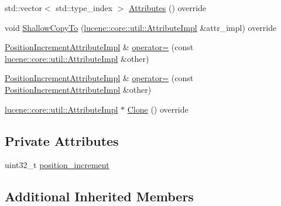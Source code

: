 \begin{DoxyCompactItemize}
\item 
std\+::vector$<$ std\+::type\+\_\+index $>$ \mbox{\hyperlink{classlucene_1_1core_1_1analysis_1_1tokenattributes_1_1PositionIncrementAttributeImpl_ab6028133ca375bdcb9774650828e7388}{Attributes}} () override
\item 
void \mbox{\hyperlink{classlucene_1_1core_1_1analysis_1_1tokenattributes_1_1PositionIncrementAttributeImpl_a887e391d3db93f6a8e76b6b464d60547}{Shallow\+Copy\+To}} (\mbox{\hyperlink{classlucene_1_1core_1_1util_1_1AttributeImpl}{lucene\+::core\+::util\+::\+Attribute\+Impl}} \&attr\+\_\+impl) override
\item 
\mbox{\hyperlink{classlucene_1_1core_1_1analysis_1_1tokenattributes_1_1PositionIncrementAttributeImpl}{Position\+Increment\+Attribute\+Impl}} \& \mbox{\hyperlink{classlucene_1_1core_1_1analysis_1_1tokenattributes_1_1PositionIncrementAttributeImpl_a8fccb463e29cc9cb90e7689cc7161488}{operator=}} (const \mbox{\hyperlink{classlucene_1_1core_1_1util_1_1AttributeImpl}{lucene\+::core\+::util\+::\+Attribute\+Impl}} \&other)
\item 
\mbox{\hyperlink{classlucene_1_1core_1_1analysis_1_1tokenattributes_1_1PositionIncrementAttributeImpl}{Position\+Increment\+Attribute\+Impl}} \& \mbox{\hyperlink{classlucene_1_1core_1_1analysis_1_1tokenattributes_1_1PositionIncrementAttributeImpl_a89b28d766574af0ba1e521adf811fe71}{operator=}} (const \mbox{\hyperlink{classlucene_1_1core_1_1analysis_1_1tokenattributes_1_1PositionIncrementAttributeImpl}{Position\+Increment\+Attribute\+Impl}} \&other)
\item 
\mbox{\hyperlink{classlucene_1_1core_1_1util_1_1AttributeImpl}{lucene\+::core\+::util\+::\+Attribute\+Impl}} $\ast$ \mbox{\hyperlink{classlucene_1_1core_1_1analysis_1_1tokenattributes_1_1PositionIncrementAttributeImpl_a68907cad12693754f1286678a7c78c21}{Clone}} () override
\end{DoxyCompactItemize}
\subsection*{Private Attributes}
\begin{DoxyCompactItemize}
\item 
uint32\+\_\+t \mbox{\hyperlink{classlucene_1_1core_1_1analysis_1_1tokenattributes_1_1PositionIncrementAttributeImpl_a3de757124d0bf5a9395e8c943c4ee5cf}{position\+\_\+increment}}
\end{DoxyCompactItemize}
\subsection*{Additional Inherited Members}


